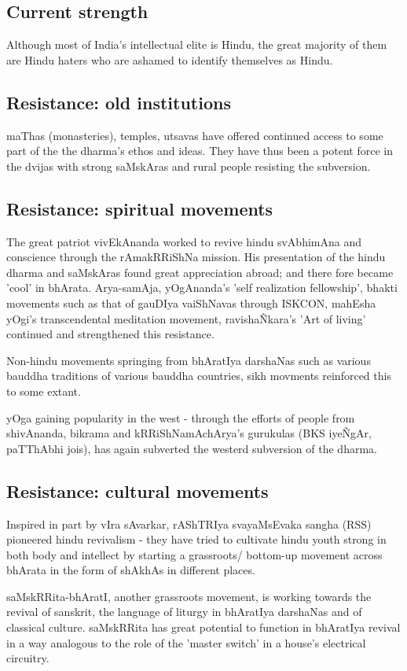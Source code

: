 \documentclass[oneside, article]{memoir}
\begin{document}
\subsection{Current strength}
Although most of India's intellectual elite is Hindu, the great majority of them are Hindu haters who are ashamed to identify themselves as Hindu.

\subsection{Resistance: old institutions}
maThas (monasteries), temples, utsavas have offered continued access to some part of the the dharma's ethos and ideas. They have thus been a potent force in the dvijas with strong saMskAras and rural people resisting the subversion.

\subsection{Resistance: spiritual movements}
The great patriot vivEkAnanda worked to revive hindu svAbhimAna and conscience through the rAmakRRiShNa mission. His presentation of the hindu dharma and saMskAras found great appreciation abroad; and there fore became 'cool' in bhArata. Arya-samAja, yOgAnanda's 'self realization fellowship', bhakti movements such as that of gauDIya vaiShNavas through ISKCON, mahEsha yOgi's transcendental meditation movement, ravisha\~Nkara's 'Art of living' continued and strengthened this resistance.

Non-hindu movements springing from bhAratIya darshaNas such as various bauddha traditions of various bauddha countries, sikh movments reinforced this to some extant.

yOga gaining popularity in the west - through the efforts of people from shivAnanda, bikrama and kRRiShNamAchArya's gurukulas (BKS iye\~NgAr, paTThAbhi jois), has again subverted the westerd subversion of the dharma.

\subsection{Resistance: cultural movements}
Inspired in part by vIra sAvarkar, rAShTRIya svayaMsEvaka sangha (RSS) pioneered hindu revivalism - they have tried to cultivate hindu youth strong in both body and intellect by starting a grassroots/ bottom-up movement across bhArata in the form of shAkhAs in different places.

saMskRRita-bhAratI, another grassroots movement, is working towards the revival of sanskrit, the language of liturgy in bhAratIya darshaNas and of classical culture. saMskRRita has great potential to function in bhAratIya revival in a way analogous to the role of the 'master switch' in a house's electrical circuitry.
\end{document}
